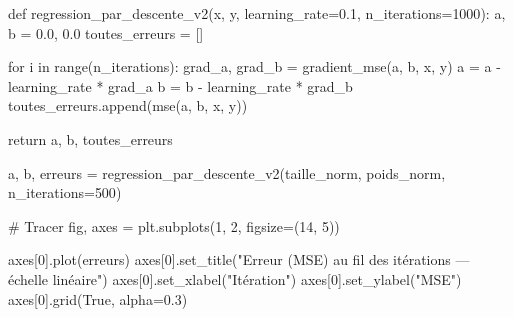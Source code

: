 \documentclass[
  french,
  11pt,
  a4paper,
]{scrbook}
\newenvironment{Shaded}{}{}
\newcommand{\BuiltInTok}[1]{\textcolor[rgb]{0.84,0.23,0.29}{#1}}
\newcommand{\CommentTok}[1]{\textcolor[rgb]{0.42,0.45,0.49}{#1}}
\newcommand{\ControlFlowTok}[1]{\textcolor[rgb]{0.84,0.23,0.29}{#1}}
\newcommand{\DecValTok}[1]{\textcolor[rgb]{0.00,0.36,0.77}{#1}}
\newcommand{\FloatTok}[1]{\textcolor[rgb]{0.00,0.36,0.77}{#1}}
\newcommand{\KeywordTok}[1]{\textcolor[rgb]{0.84,0.23,0.29}{#1}}
\newcommand{\NormalTok}[1]{\textcolor[rgb]{0.14,0.16,0.18}{#1}}
\newcommand{\OperatorTok}[1]{\textcolor[rgb]{0.14,0.16,0.18}{#1}}
\newcommand{\StringTok}[1]{\textcolor[rgb]{0.01,0.18,0.38}{#1}}
\newcommand{\VariableTok}[1]{\textcolor[rgb]{0.89,0.38,0.04}{#1}}
\begin{document}
\begin{tcolorbox}[enhanced jigsaw, arc=.35mm, bottomrule=.15mm, bottomtitle=1mm, breakable, colback=white, colbacktitle=quarto-callout-tip-color!10!white, colframe=quarto-callout-tip-color-frame, coltitle=black, left=2mm, leftrule=.75mm, opacityback=0, opacitybacktitle=0.6, rightrule=.15mm, title=\textcolor{quarto-callout-tip-color}{\faLightbulb}\hspace{0.5em}{✅ Voir la correction}, titlerule=0mm, toprule=.15mm, toptitle=1mm]

\begin{Shaded}
\begin{Highlighting}[]
\KeywordTok{def}\NormalTok{ regression\_par\_descente\_v2(x, y, learning\_rate}\OperatorTok{=}\FloatTok{0.1}\NormalTok{, n\_iterations}\OperatorTok{=}\DecValTok{1000}\NormalTok{):}
\NormalTok{    a, b }\OperatorTok{=} \FloatTok{0.0}\NormalTok{, }\FloatTok{0.0}
\NormalTok{    toutes\_erreurs }\OperatorTok{=}\NormalTok{ []}
    
    \ControlFlowTok{for}\NormalTok{ i }\KeywordTok{in} \BuiltInTok{range}\NormalTok{(n\_iterations):}
\NormalTok{        grad\_a, grad\_b }\OperatorTok{=}\NormalTok{ gradient\_mse(a, b, x, y)}
\NormalTok{        a }\OperatorTok{=}\NormalTok{ a }\OperatorTok{{-}}\NormalTok{ learning\_rate }\OperatorTok{*}\NormalTok{ grad\_a}
\NormalTok{        b }\OperatorTok{=}\NormalTok{ b }\OperatorTok{{-}}\NormalTok{ learning\_rate }\OperatorTok{*}\NormalTok{ grad\_b}
\NormalTok{        toutes\_erreurs.append(mse(a, b, x, y))}
    
    \ControlFlowTok{return}\NormalTok{ a, b, toutes\_erreurs}

\NormalTok{a, b, erreurs }\OperatorTok{=}\NormalTok{ regression\_par\_descente\_v2(taille\_norm, poids\_norm, n\_iterations}\OperatorTok{=}\DecValTok{500}\NormalTok{)}

\CommentTok{\# Tracer}
\NormalTok{fig, axes }\OperatorTok{=}\NormalTok{ plt.subplots(}\DecValTok{1}\NormalTok{, }\DecValTok{2}\NormalTok{, figsize}\OperatorTok{=}\NormalTok{(}\DecValTok{14}\NormalTok{, }\DecValTok{5}\NormalTok{))}

\NormalTok{axes[}\DecValTok{0}\NormalTok{].plot(erreurs)}
\NormalTok{axes[}\DecValTok{0}\NormalTok{].set\_title(}\StringTok{"Erreur (MSE) au fil des itérations — échelle linéaire"}\NormalTok{)}
\NormalTok{axes[}\DecValTok{0}\NormalTok{].set\_xlabel(}\StringTok{"Itération"}\NormalTok{)}
\NormalTok{axes[}\DecValTok{0}\NormalTok{].set\_ylabel(}\StringTok{"MSE"}\NormalTok{)}
\NormalTok{axes[}\DecValTok{0}\NormalTok{].grid(}\VariableTok{True}\NormalTok{, alpha}\OperatorTok{=}\FloatTok{0.3}\NormalTok{)}


\end{Highlighting}
\end{Shaded}
\end{tcolorbox}
\end{document}
